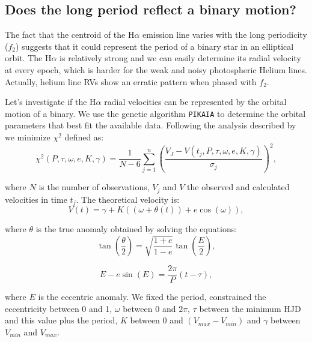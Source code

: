 \documentclass[useAMS,usenatbib]{mn2e}
\begin{document}
\subsection{Does the long period reflect a binary motion?}

The fact that the centroid of the  H$\alpha$ emission line varies with the long periodicity ($f_2$) suggests that it could represent the period 
of a binary star in an elliptical orbit. The H$\alpha$ is relatively strong and we can easily determine its radial velocity at every epoch, which is harder for the weak and noisy photospheric Helium lines. Actually, helium line RVs show an erratic pattern when phased with $f_2$.

Let's investigate if the  H$\alpha$ radial velocities can be represented by the orbital motion of a binary. We use the genetic algorithm \texttt{PIKAIA}  \citep{1995ApJS..101..309C} to determine
the orbital parameters that best fit the available data. Following the analysis described by \citet{2012MNRAS.427..607M, 2015MNRAS.448.1137M} we minimize $\chi^2$ defined as:\\

\begin{equation}
   \chi^2(P,\tau,\omega,e,K,\gamma) =\frac{1}{N-6}\sum_{j=1}^{n}\left(\frac{V_J-V(t_j,P,\tau,\omega,e,K,\gamma)}{\sigma_j}\right)^2,
\end{equation}

\noindent
where $N$ is the number of observations, $V_j$  and $V$ the observed and calculated velocities in time  $t_j$. The theoretical velocity is:\\


 \begin{equation}\label{eqn:vt}
  V(t)=\gamma + K ((\omega+\theta(t)) + e\cos(\omega)),  
 \end{equation}
 
 \noindent
 where  $\theta$ is the true anomaly obtained by solving the equations:\\
 
\begin{equation}
 \tan\left(\frac{\theta}{2}\right) = \sqrt{\frac{1+e}{1-e}}\tan\left(\frac{E}{2}\right),
\end{equation}

\begin{equation}
 E - e \sin(E)=  \frac{2\pi}{P}(t-\tau),
\end{equation}

\noindent
where $E$ is the eccentric anomaly. We fixed the period, constrained the eccentricity between 0 and 1, $\omega$ between $0$  and $2\pi$,  
 $\tau$ between the minimum HJD and this value plus the period, $K$ between $0$ and $(V_{max} - V_{min})$ and $\gamma$ between $V_{min}$  and $V_{max}$.
 
\end{document}
